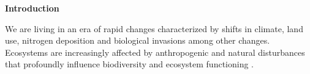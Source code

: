 \begin{center}
\textbf{\Large{}Introduction}
\end{center}

\smallskip{}



We are living in an era of rapid changes characterized by shifts in climate, land use, nitrogen deposition and biological invasions among other changes. Ecosystems are increasingly affected by anthropogenic and natural disturbances that profoundly influence biodiversity and ecosystem functioning \citep{naeem2009biodiversity}.

\begin{onehalfspace}


\end{onehalfspace}

\clearpage
